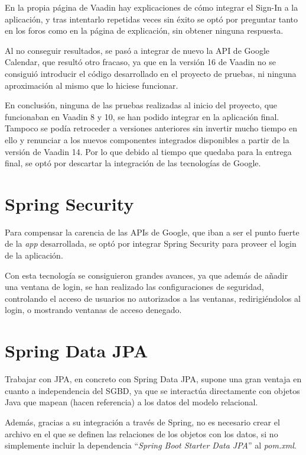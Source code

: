 En la propia página de Vaadin hay explicaciones de cómo integrar el Sign-In a la aplicación, y tras intentarlo repetidas veces sin éxito se optó por preguntar tanto en los foros como en la página de explicación, sin obtener ninguna respuesta. 

Al no conseguir resultados, se pasó a integrar de nuevo la API de Google Calendar, que resultó otro fracaso, ya que en la versión 16 de Vaadin no se consiguió introducir el código desarrollado en el proyecto de pruebas, ni ninguna aproximación al mismo que lo hiciese funcionar.

En conclusión, ninguna de las pruebas realizadas al inicio del proyecto, que funcionaban en Vaadin 8 y 10, se han podido integrar en la aplicación final. Tampoco se podía retroceder a versiones anteriores sin invertir mucho tiempo en ello y renunciar a los nuevos componentes integrados disponibles a partir de la versión de Vaadin 14. Por lo que debido al tiempo que quedaba para la entrega final, se optó por descartar la integración de las tecnologías de Google.

\section{Spring Security}
Para compensar la carencia de las APIs de Google, que iban a ser el punto fuerte de la \textit{app} desarrollada, se optó por integrar Spring Security para proveer el login de la aplicación.

Con esta tecnología se consiguieron grandes avances, ya que además de añadir una ventana de login, se han realizado las configuraciones de seguridad, controlando el acceso de usuarios no autorizados a las ventanas, redirigiéndolos al login, o mostrando ventanas de acceso denegado. 

\section{Spring Data JPA}
Trabajar con JPA, en concreto con Spring Data JPA, supone una gran ventaja en cuanto a independencia del SGBD, ya que se interactúa directamente con objetos Java que mapean (hacen referencia) a los datos del modelo relacional. 

Además, gracias a su integración a través de Spring, no es necesario crear el archivo en el que se definen las relaciones de los objetos con los datos, si no simplemente incluir la dependencia ``\textit{Spring Boot Starter Data JPA}'' al \textit{pom.xml}.


